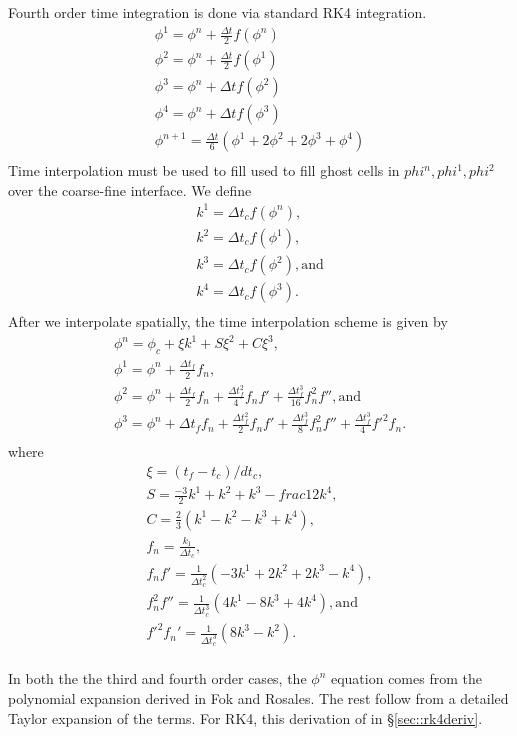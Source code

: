 \documentclass{article}
\newcommand{\dt}{{\Delta t}}
\begin{document}
Fourth order time integration is done via standard RK4 integration.
$$
\begin{array}{l}
\phi^1 = \phi^n + \frac{\dt}{2} f(\phi^n) \\
\phi^2 = \phi^n + \frac{\dt}{2} f(\phi^1) \\
\phi^3 = \phi^n + \dt f(\phi^2) \\
\phi^4 = \phi^n + \dt f(\phi^3) \\
\phi^{n+1} = \frac{\dt}{6}(\phi^1 + 2 \phi^2 + 2 \phi^3 + \phi^4) \\
\end{array}
$$
Time interpolation must be used to fill used to fill ghost cells in
$phi^n, phi^1, phi^2$ over the coarse-fine interface.  We define
$$
\begin{array}{l}
k^1 =  \dt_c f(\phi^n),\\
k^2 =  \dt_c f(\phi^1),\\
k^3 =  \dt_c f(\phi^2), \mbox{and}\\
k^4 =  \dt_c f(\phi^3).\\
\end{array}
$$
After we interpolate spatially, the time interpolation scheme is given
by 
$$
\begin{array}{l}
\phi^n = \phi_c + \xi k^1 + S \xi^2 + C \xi^3, \\
\phi^1 = \phi^n + \frac{\dt_f}{2} f_n, \\
\phi^2 = \phi^n + \frac{\dt_f}{2} f_n + \frac{\dt_f^2}{4}f_nf' +\frac{\dt_f^3}{16}f_n^2f'', \mbox{and} \\
\phi^3 = \phi^n + \dt_f f_n + \frac{\dt_f^2}{2}f_nf' 
+\frac{\dt_f^3}{8}f_n^2f''  +  \frac{\dt_f^3}{4}f'^2f_n.   \\
\end{array}
$$
where 
$$
\begin{array}{l}
\xi = (t_f- t_c)/dt_c, \\
S = \frac{-3}{2} k^1 + k^2 + k^3 - frac{1}{2} k^4, \\
C = \frac{2}{3}(k^1 - k^2 - k^3 + k^4), \\
f_n =  \frac{k_1}{\dt_c}, \\
f_nf' =  \frac{1}{\dt_c^2} (-3 k^1 + 2 k^2 + 2 k^3 - k^4),\\
f_n^2f'' =  \frac{1}{\dt_c^3} (4 k^1 - 8 k^3 +4 k^4), \mbox{and}\\
f'^2f_n' =  \frac{1}{\dt_c^3} (8 k^3 - k^2). \\
\end{array}
$$

In both the the third and fourth order cases, the $\phi^n$ equation
comes from the polynomial expansion derived in Fok and Rosales.   The
rest follow from a detailed Taylor expansion of the terms.
For RK4, this derivation of in \S \ref{sec::rk4deriv}.
\end{document}
